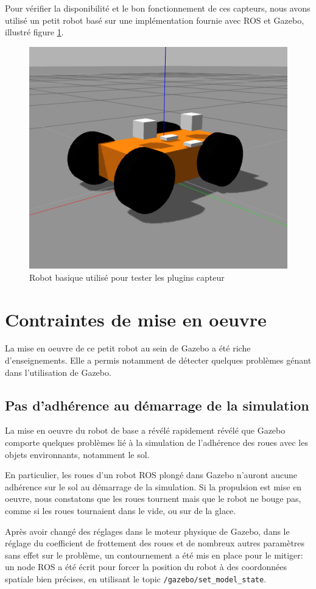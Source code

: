 \documentclass[12pt,a4paper]{report}
\begin{document}
		\para Pour vérifier la disponibilité et le bon fonctionnement de ces capteurs, nous avons utilisé un petit robot basé sur une implémentation fournie avec ROS et Gazebo, illustré figure \ref{fig:petitrobot}. 
		
		\begin{figure}[h!]
			\centering
			\includegraphics[width=0.4\linewidth]{img/image}
			\caption[petitrobot]{Robot basique utilisé pour tester les plugins capteur}
			\label{fig:petitrobot}
		\end{figure}
		
		

		
\section{Contraintes de mise en oeuvre}
	
	\para La mise en oeuvre de ce petit robot au sein de Gazebo a été riche d'enseignements. Elle a permis notamment de détecter quelques problèmes génant dans l'utilisation de Gazebo.
	
		\subsection{Pas d'adhérence au démarrage de la simulation}
		
		La mise en oeuvre du robot de base a révélé rapidement révélé que Gazebo comporte quelques problèmes  lié à la simulation de l'adhérence des roues avec les objets environnants, notamment le sol.
		
		\para En particulier, les roues d'un robot ROS plongé dans Gazebo n'auront aucune adhérence sur le sol au démarrage de la simulation. Si la propulsion est mise en oeuvre, nous constatons que les roues tournent mais que le robot ne bouge pas, comme si les roues tournaient dans le vide, ou sur de la glace.
		
		\para Après avoir changé des réglages dans le moteur physique de Gazebo, dans le réglage du coefficient de frottement des roues et de nombreux autres paramètres sans effet sur le problème, un contournement a été mis en place pour le mitiger: un node ROS a été écrit pour forcer la position du robot à des coordonnées spatiale bien précises, en utilisant le topic \verb|/gazebo/set_model_state|.
		
\end{document}
